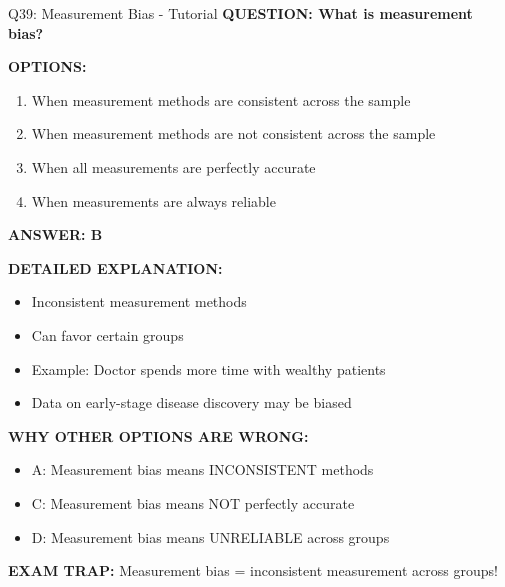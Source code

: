 \documentclass[8pt]{beamer}
\begin{document}
	\begin{frame}{Q39: Measurement Bias - Tutorial}
		\fontsize{6.5}{7.5}\selectfont
		\textbf{QUESTION: What is measurement bias?}
		
		\vspace{0.1cm}
		\textbf{OPTIONS:}
		\begin{enumerate}
			\item When measurement methods are consistent across the sample
			\item When measurement methods are not consistent across the sample
			\item When all measurements are perfectly accurate
			\item When measurements are always reliable
		\end{enumerate}
		
		\vspace{0.1cm}
		\textcolor{myblue}{\textbf{ANSWER: B}}
		
		\vspace{0.1cm}
		\textbf{DETAILED EXPLANATION:}
		\begin{itemize}
			\item Inconsistent measurement methods
			\item Can favor certain groups
			\item Example: Doctor spends more time with wealthy patients
			\item Data on early-stage disease discovery may be biased
		\end{itemize}
		
		\vspace{0.1cm}
		\textcolor{myred}{\textbf{WHY OTHER OPTIONS ARE WRONG:}}
		\begin{itemize}
			\item \textcolor{myred}{A:} Measurement bias means INCONSISTENT methods
			\item \textcolor{myred}{C:} Measurement bias means NOT perfectly accurate
			\item \textcolor{myred}{D:} Measurement bias means UNRELIABLE across groups
		\end{itemize}
		
		\textcolor{myred}{\textbf{EXAM TRAP:}} Measurement bias = \textcolor{myblue}{inconsistent measurement across groups}!
	\end{frame}
	
\end{document}

